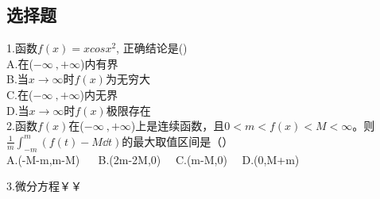 

\subsection{选择题}
1.函数$f(x)=xcosx^2$, 正确结论是()\\
A.在($-\infty~,+\infty$)内有界\\
B.当$x\to\infty$时$f(x)$为无穷大\\
C.在($-\infty~,+\infty$)内无界\\
D.当$x\to\infty$时$f(x)$极限存在\\

2.函数$f(x)$在($-\infty~,+\infty$)上是连续函数，且$0<m<f(x)<M<\infty$。则
$ \frac{1}{m} \int_{-m}^{m}(f(t)-M \dd{t})$的最大取值区间是（）\\
A.(-M-m,m-M) $\quad$ B.(2m-2M,0)$\quad$  C.(m-M,0)$\quad$  D.(0,M+m)

3.微分方程￥￥